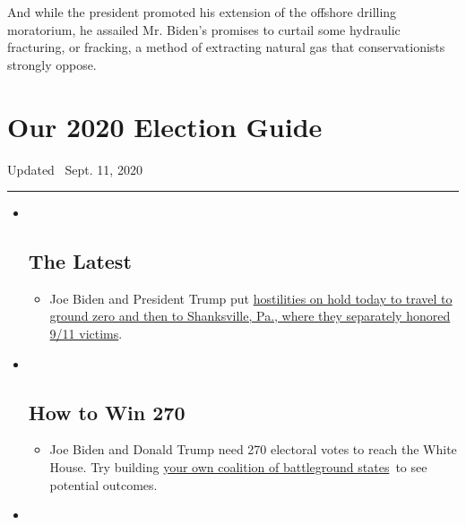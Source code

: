 And while the president promoted his extension of the offshore drilling
moratorium, he assailed Mr. Biden's promises to curtail some hydraulic
fracturing, or fracking, a method of extracting natural gas that
conservationists strongly oppose.

\hypertarget{our-2020-election-guide}{%
\section{Our 2020 Election Guide}\label{our-2020-election-guide}}

Updated ~Sept. 11, 2020

\begin{center}\rule{0.5\linewidth}{\linethickness}\end{center}

\begin{itemize}
\item ~
  \hypertarget{the-latest}{%
  \subsection{The Latest}\label{the-latest}}

  \begin{itemize}
  \item
    Joe Biden and President Trump put
    \href{https://www.nytimes3xbfgragh.onion/2020/09/11/us/politics/shanksville-trump-biden.html?action=click\&pgtype=Article\&state=default\&region=BELOW_MAIN_CONTENT\&context=storylines_guide}{hostilities
    on hold today to travel to ground zero and then to Shanksville, Pa.,
    where they separately honored 9/11 victims}.
  \end{itemize}
\item ~
  \hypertarget{how-to-win-270}{%
  \subsection{How to Win 270}\label{how-to-win-270}}

  \begin{itemize}
  \item
    Joe Biden and Donald Trump need 270 electoral votes to reach the
    White House. Try building
    \href{https://www.nytimes3xbfgragh.onion/interactive/2020/us/elections/election-states-biden-trump.html?action=click\&pgtype=Article\&state=default\&region=BELOW_MAIN_CONTENT\&context=storylines_guide}{your
    own coalition of battleground states}~to see potential outcomes.
  \end{itemize}
\item ~
  \hypertarget{voting-by-mail}{%
}
\end{itemize}
